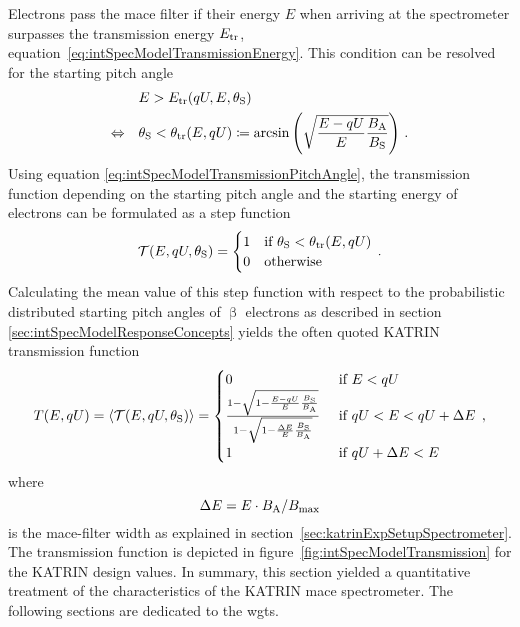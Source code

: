 Electrons pass the \gls{mace} filter if their energy $E$ when arriving at the spectrometer surpasses the transmission energy $E_\mathrm{tr}$, equation~\eqref{eq:intSpecModelTransmissionEnergy}. This condition can be resolved for the starting pitch angle~\cite{Groh2015}
\begin{align}
&E > E_\mathrm{tr}(qU,E,\theta_\mathrm{S}) \nonumber \\
\Leftrightarrow \quad
& \theta_\mathrm{S} < \theta_\mathrm{tr}(E,qU)
\coloneqq
\arcsin
\left(\sqrt{
	\frac{E-qU}{E} 
	\frac{B_\mathrm{A}}{B_\mathrm{S}}
}\right)
\text{\,.}
\label{eq:intSpecModelTransmissionPitchAngle}
\end{align}
Using equation \eqref{eq:intSpecModelTransmissionPitchAngle}, the transmission function depending on the starting pitch angle and the starting energy of electrons can be formulated as a step function
\begin{equation}
\label{eq:intSpecModelTransmissionStep}
\mathcal{T}(E, qU, \theta_\mathrm{S}) =
\begin{cases}
1 & \text{if } \theta_\mathrm{S} < \theta_\mathrm{tr}(E,qU) \\
0 & \text{otherwise} 
\end{cases}
\text{\,.}
\end{equation}
Calculating the mean value of this step function with respect to the probabilistic distributed starting pitch angles of $\upbeta$ electrons as described in section~ \ref{sec:intSpecModelResponseConcepts} yields the often quoted KATRIN transmission function~\cite{Angrik:2005ep}
\begin{equation}
\label{eq:intSpecModelTransmission}
	T(E, qU) = 
	\left\langle{\mathcal{T}(E, qU, \theta_\mathrm{S})}\right\rangle =
	\begin{cases}
	0 & \text{ if } E < qU \\
	\frac{
		1-\sqrt{
			1-\frac{E-qU}{E} 
			\frac{B_\mathrm{S}}{B_\mathrm{A}}
		} 
	}{
		1-\sqrt{1-\frac{\Delta E}{E}\frac{B_\mathrm{S}}{B_\mathrm{A}}}
	}
	& \text{ if } qU < E < qU + \Delta E \\
	1 & \text{ if } qU + \Delta E < E
	\end{cases}
	\text{\,,}
\end{equation}
where 
\begin{equation}
	\label{eq:intSpecModelTransmissionMACEFilterWidth}
	\Delta E=E\cdot B_\mathrm{A}/B_\mathrm{max}
\end{equation}
is the \gls{mace}-filter width as explained in section~\ref{sec:katrinExpSetupSpectrometer}. The transmission function is depicted in figure~\ref{fig:intSpecModelTransmission} for the KATRIN design values. In summary, this section yielded a quantitative treatment of the characteristics of the KATRIN \gls{mace} spectrometer. The following sections are dedicated to the \gls{wgts}.

